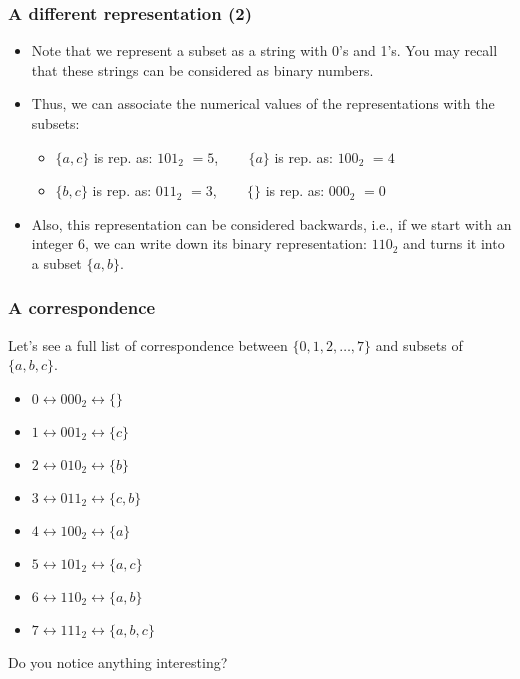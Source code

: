 \begin{frame}\frametitle{A different representation (2)}
  \begin{itemize}
  \item Note that we represent a subset as a string with 0's and 1's.
    You may recall that these strings can be considered as binary
    numbers.
  \item Thus, we can associate the numerical values of the
    representations with the subsets:
    \pause
    \begin{itemize}
    \item $\{a,c\}$ is rep. as: $101_2$ \pause $= 5$, \ \ \ \pause
      $\{a\}$ is rep. as: $100_2$ \pause $= 4$
    \item $\{b,c\}$ is rep. as: $011_2$ \pause $= 3$, \ \ \ \pause
      $\{\}$ is rep. as: $000_2$ \pause $= 0$
    \end{itemize}
    \pause
  \item Also, this representation can be considered backwards, i.e.,
    if we start with an integer $6$, we can write down its binary
    representation: $110_2$ and turns it into a subset $\{a,b\}$.
  \end{itemize}
\end{frame}

\begin{frame}\frametitle{A correspondence}
  Let's see a full list of correspondence between $\{0,1,2,\ldots,7\}$
  and subsets of $\{a,b,c\}$.
  \begin{itemize}
  \item $0 \leftrightarrow 000_2 \leftrightarrow \{\}$
  \item $1 \leftrightarrow 001_2 \leftrightarrow \{c\}$
  \item $2 \leftrightarrow 010_2 \leftrightarrow \{b\}$
  \item $3 \leftrightarrow 011_2 \leftrightarrow \{c,b\}$
  \item $4 \leftrightarrow 100_2 \leftrightarrow \{a\}$
  \item $5 \leftrightarrow 101_2 \leftrightarrow \{a,c\}$
  \item $6 \leftrightarrow 110_2 \leftrightarrow \{a,b\}$
  \item $7 \leftrightarrow 111_2 \leftrightarrow \{a,b,c\}$
  \end{itemize}
  \pause

  Do you notice anything interesting?
\end{frame}

